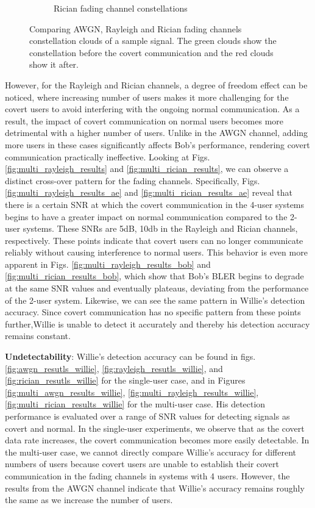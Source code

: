 \begin{figure}[tp!]
\begin{subfigure}{0.325\linewidth}
\begin{subfigure}{0.48\textwidth}
		\end{subfigure}
		\caption{Rician fading channel constellations}
		\label{fig:rician_constellation}
	\end{subfigure}
	\caption{Comparing AWGN, Rayleigh and Rician fading channels constellation clouds of a sample signal. The green clouds show the constellation before the covert communication and the red clouds show it after.}
\end{figure}


However, for the Rayleigh and Rician channels, a degree of freedom effect can be noticed, where increasing number of users makes it more challenging for the covert users to avoid interfering with the ongoing normal communication. As a result, the impact of covert communication on normal users becomes more detrimental with a higher number of users. Unlike in the AWGN channel, adding more users in these cases significantly affects Bob's performance, rendering covert communication practically ineffective. Looking at Figs. \ref{fig:multi_rayleigh_results} and \ref{fig:multi_rician_results}, we can observe a distinct cross-over pattern for the fading channels. Specifically, Figs. \ref{fig:multi_rayleigh_results_ae} and \ref{fig:multi_rician_results_ae} reveal that there is a certain SNR at which the covert communication in the 4-user systems begins to have a greater impact on normal communication compared to the 2-user systems. These SNRs are 5dB, 10db in the Rayleigh and Rician channels, respectively. These points indicate that covert users can no longer communicate reliably without causing interference to normal users. This behavior is even more apparent in Figs. \ref{fig:multi_rayleigh_results_bob} and \ref{fig:multi_rician_results_bob}, which show that Bob's BLER begins to degrade at the same SNR values and eventually plateaus, deviating from the performance of the 2-user system. Likewise, we can see the same pattern in Willie's detection accuracy. Since covert communication has no specific pattern from these points further,Willie is unable to detect it accurately and thereby his detection accuracy remains constant.

\textbf{Undetectability}: Willie's detection accuracy can be found in figs. \ref{fig:awgn_resutls_willie}, \ref{fig:rayleigh_resutls_willie}, and \ref{fig:rician_resutls_willie} for the single-user case, and in Figures \ref{fig:multi_awgn_results_willie}, \ref{fig:multi_rayleigh_results_willie}, \ref{fig:multi_rician_results_willie} for the multi-user case. His detection performance is evaluated over a range of SNR values for detecting signals as covert and normal. In the single-user experiments, we observe that as the covert data rate increases, the covert communication becomes more easily detectable. In the multi-user case, we cannot directly compare Willie's accuracy for different numbers of users because covert users are unable to establish their covert communication in the fading channels in systems with 4 users. However, the results from the AWGN channel indicate that Willie's accuracy remains roughly the same as we increase the number of users.

